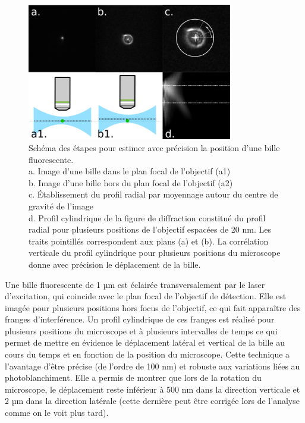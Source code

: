 \begin{figure}
\centering
\includegraphics[width=0.8\textwidth]{./files/bead_position.svg.png}
\caption{Schéma des étapes pour estimer avec précision la position d'une bille fluorescente.\\
a. Image d'une bille dans le plan focal de l'objectif (a1)\\
b. Image d'une bille hors du plan focal de l'objectif (a2)\\
c. Établissement du profil radial par moyennage autour du centre de gravité de l'image\\
d. Profil cylindrique de la figure de diffraction constitué du profil radial pour plusieurs positions de l'objectif espacées de 20 nm. Les traits pointillés correspondent aux plans (a) et (b). La corrélation verticale du profil cylindrique pour plusieurs positions du microscope donne avec précision le déplacement de la bille.
\label{FIGbeadstability}}
\end{figure}

Une bille fluorescente de 1 µm est éclairée transversalement par le laser d'excitation, qui coincide avec le plan focal de l'objectif de détection. Elle est imagée pour plusieurs positions hors focus de l'objectif, ce qui fait apparaître des franges d'interférence. Un profil cylindrique de ces franges est réalisé pour plusieurs positions du microscope et à plusieurs intervalles de temps ce qui permet de mettre en évidence le déplacement latéral et vertical de la bille au cours du temps et en fonction de la position du microscope. Cette technique a l'avantage d'être précise (de l'ordre de 100 nm) et robuste aux variations liées au photoblanchiment. Elle a permis de montrer que lors de la rotation du microscope, le déplacement reste inférieur à 500 nm dans la direction verticale et 2 µm dans la direction latérale (cette dernière peut être corrigée lors de l'analyse comme on le voit plus tard).

